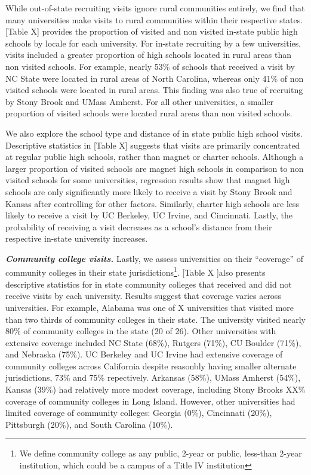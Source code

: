 \documentclass[twoside]{article}
\begin{document}
While out-of-state recruiting visits ignore rural communities entirely, we find that many universities make visits to rural communities within their respective states. [Table X] provides the proportion of visited and non visited in-state public high schools by locale for each university. For in-state recruiting by a few universities, visits included a greater proportion of high schools located in rural areas than non visited schools. For example, nearly 53\% of schools that received a visit by NC State were located in rural areas of North Carolina, whereas only 41\% of non visited schools were located in rural areas. This finding was also true of recruitng by Stony Brook and UMass Amherst. For all other universities, a smaller proportion of visited schools were located rural areas than non visited schools. 

We also explore the school type and distance of in state public high school visits. Descriptive statistics in [Table X] suggests that visits are primarily concentrated at regular public high schools, rather than magnet or charter schools. Although a larger proportion of visited schools are magnet high schools in comparison to non visited schools for some universities, regression results show that magnet high schools are only significantly more likely to receive a visit by Stony Brook and Kansas after controlling for other factors. Similarly, charter high schools are less likely to receive a visit by UC Berkeley, UC Irvine, and Cincinnati.  Lastly, the probability of receiving a visit decreases as a school’s distance from their respective in-state university increases.

\textbf{\textit{Community college visits.}} Lastly, we assess universities on their “coverage” of community colleges in their state jurisdictions\footnote{We define community college as any public, 2-year or public, less-than 2-year institution, which could be a campus of a Title IV institution}. [Table X ]also presents descriptive statistics for in state community colleges that received and did not receive visits by each university. Results suggest that coverage varies across universities. For example, Alabama was one of X universities that visited more than two thirds of community colleges in their state. The university visited nearly 80\% of community colleges in the state (20 of 26). Other universities with extensive coverage included NC State (68\%), Rutgers (71\%), CU Boulder (71\%), and Nebraska (75\%).  UC Berkeley and UC Irvine had extensive coverage of community colleges across California despite reasonbly having smaller alternate jurisdictions, 73\% and 75\% repectively. Arkansas (58\%), UMass Amherst (54\%), Kansas (39\%) had relatively more modest coverage, including Stony Brooks XX\% coverage of community colleges in Long Island. However, other universities had limited coverage of community colleges: Georgia (0\%), Cincinnati (20\%), Pittsburgh (20\%), and South Carolina (10\%).
\end{document}
